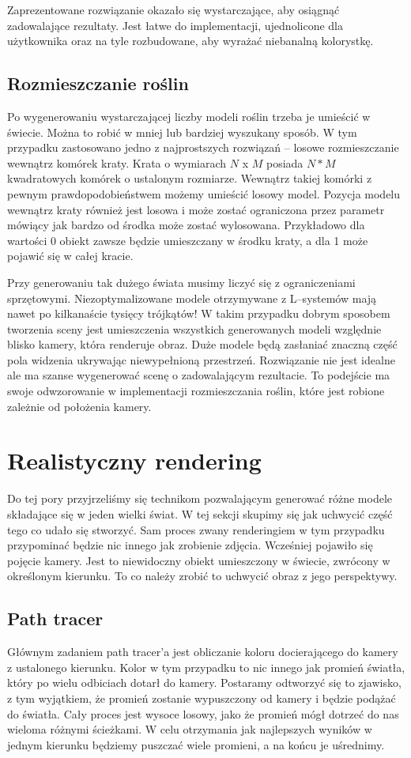 \documentclass[inz,shortabstract]{iithesis}
\begin{document}
        Zaprezentowane rozwiązanie okazało się wystarczające, aby osiągnąć zadowalające rezultaty. Jest łatwe do implementacji, ujednolicone dla użytkownika oraz na tyle rozbudowane, aby wyrażać niebanalną kolorystkę.
        
    \section{Rozmieszczanie roślin}
        Po wygenerowaniu wystarczającej liczby modeli roślin trzeba je umieścić w świecie. Można to robić w mniej lub bardziej wyszukany sposób. W tym przypadku zastosowano jedno z najprostszych rozwiązań -- losowe rozmieszczanie wewnątrz komórek kraty. Krata o wymiarach $N$ x $M$ posiada $N * M$ kwadratowych komórek o ustalonym rozmiarze. Wewnątrz takiej komórki z pewnym prawdopodobieństwem możemy umieścić losowy model. Pozycja modelu wewnątrz kraty również jest losowa i może zostać ograniczona przez parametr mówiący jak bardzo od środka może zostać wylosowana. Przykładowo dla wartości 0 obiekt zawsze będzie umieszczany w środku kraty, a dla 1 może pojawić się w całej kracie. 
        
        Przy generowaniu tak dużego świata musimy liczyć się z ograniczeniami sprzętowymi. Niezoptymalizowane modele otrzymywane z L--systemów mają nawet po kilkanaście tysięcy trójkątów! W takim przypadku dobrym sposobem tworzenia sceny jest umieszczenia wszystkich generowanych modeli względnie blisko kamery, która renderuje obraz. Duże modele będą zasłaniać znaczną część pola widzenia ukrywając niewypełnioną przestrzeń. Rozwiązanie nie jest idealne ale ma szanse wygenerować scenę o zadowalającym rezultacie. To podejście ma swoje odwzorowanie w implementacji rozmieszczania roślin, które jest robione zależnie od położenia kamery.
        
\chapter{Realistyczny rendering}
    Do tej pory przyjrzeliśmy się technikom pozwalającym generować różne modele składające się w jeden wielki świat. W tej sekcji skupimy się jak uchwycić część tego co udało się stworzyć. Sam proces zwany renderingiem w tym przypadku przypominać będzie nic innego jak zrobienie zdjęcia. Wcześniej pojawiło się pojęcie kamery. Jest to niewidoczny obiekt umieszczony w świecie, zwrócony w określonym kierunku. To co należy zrobić to uchwycić obraz z jego perspektywy. 
    
    \section{Path tracer}
        Głównym zadaniem path tracer'a jest obliczanie koloru docierającego do kamery z ustalonego kierunku. Kolor w tym przypadku to nic innego jak promień światła, który po wielu odbiciach dotarł do kamery. Postaramy odtworzyć się to zjawisko, z tym wyjątkiem, że promień zostanie wypuszczony od kamery i będzie podążać do światła. Cały proces jest wysoce losowy, jako że promień mógł dotrzeć do nas wieloma różnymi ścieżkami. W celu otrzymania jak najlepszych wyników w jednym kierunku będziemy puszczać wiele promieni, a na końcu je uśrednimy.
        
\end{document}

